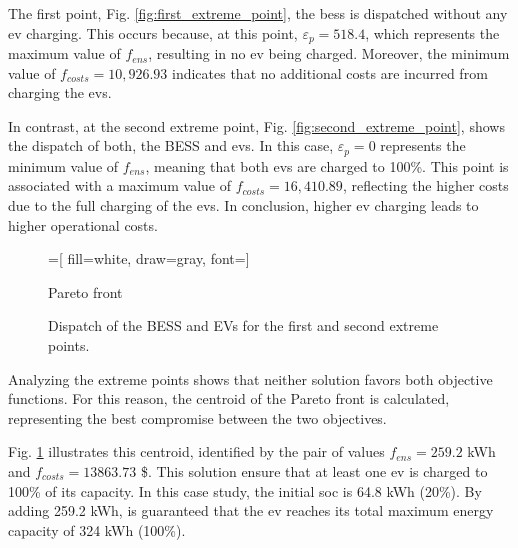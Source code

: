 \documentclass[preprint, 10pt, 5p]{elsarticle}
\begin{document}
The first point, Fig. \ref{fig:first_extreme_point}, 
the \gls{bess} is dispatched without any \gls{ev} charging. This occurs because, 
at this point, $\varepsilon_{p} = 518.4$, which represents the maximum value 
of $f_{ens}$, resulting in no \gls{ev} being charged. Moreover, 
the minimum value of $f_{costs} = 10,926.93$ indicates that no additional 
costs are incurred from charging the \glspl{ev}.

In contrast, at the second extreme point, Fig. \ref{fig:second_extreme_point}, 
shows the dispatch of both, the BESS and \glspl{ev}. In this case, 
$\varepsilon_{p} = 0$ represents the minimum value of $f_{ens}$, 
meaning that both \glspl{ev} are charged to 100\%. 
This point is associated with a maximum value of $f_{costs} = 16,410.89$, 
reflecting the higher costs due to the full charging of the \glspl{ev}. 
In conclusion, higher \gls{ev} charging leads to higher operational costs.

\begin{figure}[ht!]
    \centering
    =[
    fill=white,
    draw=gray,
    font=\footnotesize]
    
    \caption{Pareto front}
    \label{fig:pareto_front}
\end{figure}

\begin{figure}[htb!]
    \centering
    \hfill
    \caption{Dispatch of the BESS and EVs for the 
    first and second extreme points.}
    \label{fig:extreme_points}
\end{figure}

Analyzing the extreme points shows that neither solution favors both objective 
functions. For this reason, the centroid of the Pareto front is calculated, 
representing the best compromise between the two objectives.

Fig. \ref{fig:pareto_front} illustrates this centroid, identified by the pair
of values $f_{ens} = 259.2$ kWh and $f_{costs} = 13 863.73$ \$. This solution 
ensure that at least one \gls{ev} is 
charged to 100\% of its capacity. In this case study, 
the initial \gls{soc} is 64.8 kWh (20\%). By adding 259.2 kWh, is guaranteed 
that the \gls{ev} reaches its total maximum energy capacity of 324 kWh (100\%).
\end{document}
